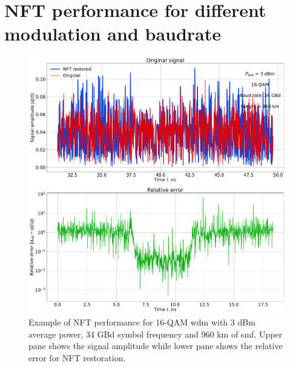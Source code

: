 \section{NFT performance for different modulation and baudrate}


\begin{figure}[!hbt]
    \centering
    \includegraphics[width=0.8\linewidth]{images/window/nft_restoration_and_relative_error_16qam_34gbd_12spans_80km.pdf}
    \caption{Example of NFT performance for 16-QAM \gls{wdm} with 3 dBm average power, 34 GBd symbol frequency and 960 km of \gls{smf}. Upper pane shows the signal amplitude while lower pane shows the relative error for NFT restoration.}
    \label{fig:nft_restor_example}
\end{figure}

